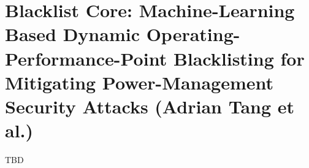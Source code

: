 \section{Blacklist Core: Machine-Learning Based Dynamic
Operating-Performance-Point Blacklisting for Mitigating Power-Management
Security Attacks (Adrian Tang et al.)}

TBD

